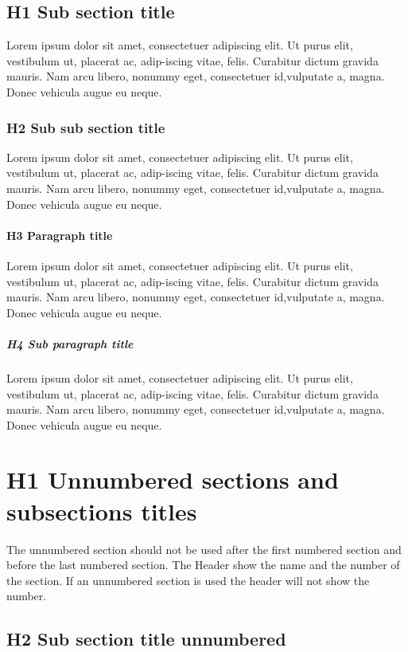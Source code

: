 \documentclass[Theme1]{{template_material/eurostat}}
\begin{document}
\subsection{H1 Sub section title}
Lorem ipsum dolor sit amet, consectetuer adipiscing elit. Ut purus elit, vestibulum ut, placerat ac, adip-iscing vitae, felis. Curabitur dictum gravida mauris. Nam arcu libero, nonummy eget, consectetuer id,vulputate a, magna. Donec vehicula augue eu neque.
\subsubsection{H2 Sub sub section title}
Lorem ipsum dolor sit amet, consectetuer adipiscing elit. Ut purus elit, vestibulum ut, placerat ac, adip-iscing vitae, felis. Curabitur dictum gravida mauris. Nam arcu libero, nonummy eget, consectetuer id,vulputate a, magna. Donec vehicula augue eu neque.
\paragraph{H3 Paragraph title}
Lorem ipsum dolor sit amet, consectetuer adipiscing elit. Ut purus elit, vestibulum ut, placerat ac, adip-iscing vitae, felis. Curabitur dictum gravida mauris. Nam arcu libero, nonummy eget, consectetuer id,vulputate a, magna. Donec vehicula augue eu neque.
\subparagraph{H4 Sub paragraph title}
Lorem ipsum dolor sit amet, consectetuer adipiscing elit. Ut purus elit, vestibulum ut, placerat ac, adip-iscing vitae, felis. Curabitur dictum gravida mauris. Nam arcu libero, nonummy eget, consectetuer id,vulputate a, magna. Donec vehicula augue eu neque.
\newpage %

\section*{H1 Unnumbered sections and subsections titles}

The unnumbered section should not be used after the first numbered section and before the last numbered section. The Header show the name and the number of the section. If an unnumbered section is used the header will not show the number. 

\subsection*{H2 Sub section title unnumbered }
\end{document}

